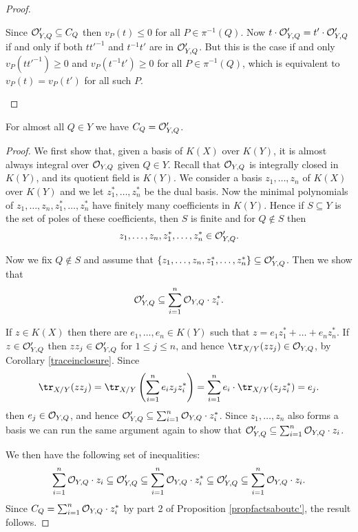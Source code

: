 \begin{proof}
\begin{enumerate}
        
        
        Since ${\cal O}_{Y,Q}'\subseteq C_Q$ then $v_P(t)\leq 0$ for all $P\in \pi^{-1}(Q)$.
        Now $t\cdot {\cal O}_{Y,Q}' = t'\cdot {\cal O}_{Y,Q}'$ if and only if both $tt'^{-1}$ and $t^{-1}t'$ are in ${\cal O}_{Y,Q}'$.
        But this is the case if and only $v_P(tt'^{-1}) \geq 0$ and $v_P(t^{-1}t')\geq 0$ for all $P\in \pi^{-1}(Q)$, which is equivalent to $v_P(t)=v_P(t')$ for all such $P$.
        \end{enumerate}
    \end{proof}

    \begin{prop}\label{almostallqiny}
    For almost all $Q\in Y$ we have $C_Q= {\cal O}_{Y,Q}'$.
    \end{prop}
    \begin{proof}
    We first show that, given a basis of $K(X)$ over $K(Y)$, it is almost always integral over ${\cal O}_{Y,Q}$ given $Q\in Y$.
    Recall that ${\cal O}_{Y,Q}$ is integrally closed in $K(Y)$, and its quotient field is $K(Y)$.
    We consider a basis $z_1,\ldots ,z_n$ of $K(X)$ over $K(Y)$ and we let $z_1^*,\ldots ,z_n^*$ be the dual basis.
    Now the minimal polynomials of $z_1,\ldots, z_n,z_1^*,\ldots, z_n^*$ have finitely many coefficients in $K(Y)$.
    Hence if $S\subseteq Y$ is the set of poles of these coefficients, then $S$ is finite and for $Q\notin S$ then 
        \[
        z_1,\ldots,z_n,z_1^*,\ldots, z_n^*\in {\cal O}_{Y,Q}'.
        \]
    
    Now we fix $Q \notin S$ and assume that $\{z_1,\ldots ,z_n,z_1^*,\ldots, z_n^*\}\subseteq {\cal O}_{Y,Q}'$. 
    Then we show that 
        \[
        {\cal O}_{Y,Q}' \subseteq \sum_{i=1}^n {\cal O}_{Y,Q}\cdot z_i^*.
        \]
    
    If $z\in K(X)$ then there are $e_1,\ldots, e_n\in K(Y)$ such that $z=e_1z_1^*+\ldots +e_nz_n^*$.
    If $z\in {\cal O}_{Y,Q}'$ then $zz_j\in {\cal O}_{Y,Q}'$ for $1\leq j\leq n$, and hence $\tr_{X/Y}(zz_j)\in \cO_{Y,Q}$, by Corollary \ref{traceinclosure}.
    Since
        \[
        \tr_{X/Y}(zz_j) = \tr_{X/Y}\left(\sum_{i=1}^n e_iz_jz_i^*\right) = \sum_{i=1}^ne_i\cdot \tr_{X/Y}(z_jz_i^*) = e_j.
        \]
    then $e_j\in {\cal O}_{Y,Q}$, and hence ${\cal O}_{Y,Q}'\subseteq \sum_{i=1}^n{\cal O}_{Y,Q}\cdot z_i^*$.
    Since $z_1,\ldots, z_n$ also forms a basis we can run the same argument again to show that ${\cal O}_{Y,Q}'\subseteq \sum_{i=1}^n{\cal O}_{Y,Q}\cdot z_i$.
    
    We then have the following set of inequalities:
        \[
        \sum_{i=1}^n {\cal O}_{Y,Q}\cdot z_i \subseteq {\cal O}_{Y,Q}' \subseteq \sum_{i=1}^n{\cal O}_{Y,Q}\cdot z_i^* \subseteq {\cal O}_{Y,Q}'\subseteq \sum_{i=1}^n {\cal O}_{Y,Q}\cdot z_i.
        \]
        Since $C_Q = \sum_{i=1}^n {\cal O}_{Y,Q}\cdot z_i^*$ by part 2 of Proposition \ref{propfactsaboutc'}, the result follows.
    \end{proof}

